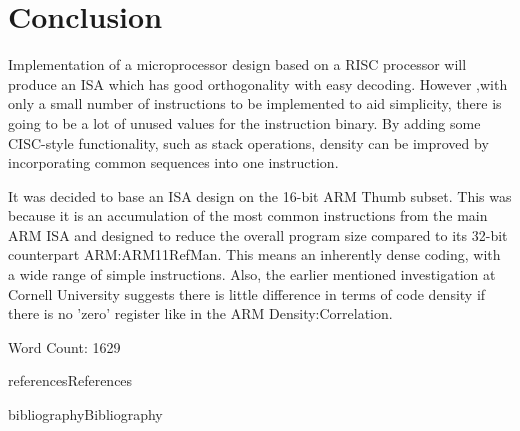 \documentclass[12pt,a4paper]{article}
\begin{document}
\section{Conclusion}
Implementation of a microprocessor design based on a RISC processor will produce an ISA which has good orthogonality with easy decoding. However ,with only a small number of instructions to be implemented to aid simplicity, there is going to be a lot of unused values for the instruction binary. By adding some CISC-style functionality, such as stack operations, density can be improved by incorporating common sequences into one instruction.

It was decided to base an ISA design on the 16-bit ARM Thumb subset. This was because it is an accumulation of the most common instructions from the main ARM ISA and designed to reduce the overall program size compared to its 32-bit counterpart \cite{ref}{ARM:ARM11RefMan}. This means an inherently dense coding, with a wide range of simple instructions. Also, the earlier mentioned investigation at Cornell University suggests there is little difference in terms of code density if there is no 'zero' register like in the ARM \cite{ref}{Density:Correlation}.

\vspace*{\baselineskip}
Word Count: 1629%

\newpage
{references}{References}

\newpage
\makeatletter 
	\renewcommand\@biblabel[1]{\textbullet}
\makeatother
{bibliography}{Bibliography}
\end{document}
